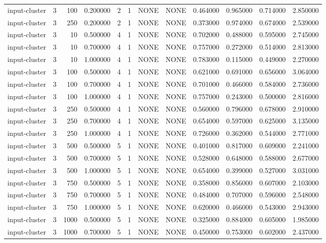 \begin{tabular}{lrrrllllrrrr}
input-cluster & 3 & 100 & 0.200000 & 2 & 1 & NONE & NONE & 0.464000 & 0.965000 & 0.714000 & 2.850000 \\
input-cluster & 3 & 250 & 0.200000 & 2 & 1 & NONE & NONE & 0.373000 & 0.974000 & 0.674000 & 2.539000 \\
input-cluster & 3 & 10 & 0.500000 & 4 & 1 & NONE & NONE & 0.702000 & 0.488000 & 0.595000 & 2.745000 \\
input-cluster & 3 & 10 & 0.700000 & 4 & 1 & NONE & NONE & 0.757000 & 0.272000 & 0.514000 & 2.813000 \\
input-cluster & 3 & 10 & 1.000000 & 4 & 1 & NONE & NONE & 0.783000 & 0.115000 & 0.449000 & 2.270000 \\
input-cluster & 3 & 100 & 0.500000 & 4 & 1 & NONE & NONE & 0.621000 & 0.691000 & 0.656000 & 3.064000 \\
input-cluster & 3 & 100 & 0.700000 & 4 & 1 & NONE & NONE & 0.701000 & 0.466000 & 0.584000 & 2.736000 \\
input-cluster & 3 & 100 & 1.000000 & 4 & 1 & NONE & NONE & 0.757000 & 0.243000 & 0.500000 & 2.816000 \\
input-cluster & 3 & 250 & 0.500000 & 4 & 1 & NONE & NONE & 0.560000 & 0.796000 & 0.678000 & 2.910000 \\
input-cluster & 3 & 250 & 0.700000 & 4 & 1 & NONE & NONE & 0.654000 & 0.597000 & 0.625000 & 3.135000 \\
input-cluster & 3 & 250 & 1.000000 & 4 & 1 & NONE & NONE & 0.726000 & 0.362000 & 0.544000 & 2.771000 \\
input-cluster & 3 & 500 & 0.500000 & 5 & 1 & NONE & NONE & 0.401000 & 0.817000 & 0.609000 & 2.241000 \\
input-cluster & 3 & 500 & 0.700000 & 5 & 1 & NONE & NONE & 0.528000 & 0.648000 & 0.588000 & 2.677000 \\
input-cluster & 3 & 500 & 1.000000 & 5 & 1 & NONE & NONE & 0.654000 & 0.399000 & 0.527000 & 3.031000 \\
input-cluster & 3 & 750 & 0.500000 & 5 & 1 & NONE & NONE & 0.358000 & 0.856000 & 0.607000 & 2.103000 \\
input-cluster & 3 & 750 & 0.700000 & 5 & 1 & NONE & NONE & 0.484000 & 0.707000 & 0.596000 & 2.548000 \\
input-cluster & 3 & 750 & 1.000000 & 5 & 1 & NONE & NONE & 0.620000 & 0.466000 & 0.543000 & 2.943000 \\
input-cluster & 3 & 1000 & 0.500000 & 5 & 1 & NONE & NONE & 0.325000 & 0.884000 & 0.605000 & 1.985000 \\
input-cluster & 3 & 1000 & 0.700000 & 5 & 1 & NONE & NONE & 0.450000 & 0.753000 & 0.602000 & 2.437000 \\

\end{tabular}
